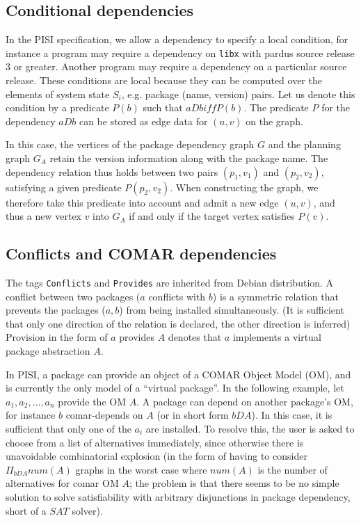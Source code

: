 \documentclass[a4paper,11pt]{article}
\begin{document}
\subsection{Conditional dependencies}

In the PISI specification, we allow a dependency to specify a local
condition, for instance a program may require a dependency on
\texttt{libx} with pardus source release $3$ or greater. Another
program may require a dependency on a particular source release. These
conditions are local because they can be computed over the elements of
system state $S_i$, e.g. package (name, version) pairs. Let us denote this
condition by a predicate $P(b)$ such that $aDb iff P(b)$.  The
predicate $P$ for the dependency $aDb$ can be stored as edge data for
$(u,v)$ on the graph.

In this case, the vertices of the package dependency graph $G$ and the
planning graph $G_A$ retain the version information along with the
package name. The dependency relation thus holds between two pairs
$(p_1,v_1)$ and $(p_2,v_2)$, satisfying a given predicate
$P(p_2,v_2)$. When constructing the graph, we therefore take this
predicate into account and admit a new edge $(u,v)$, and thus a new
vertex $v$ into $G_A$ if and only if the target vertex satisfies
$P(v)$.

\subsection{Conflicts and COMAR dependencies}

The tags \texttt{Conflicts} and \texttt{Provides} are inherited from
Debian distribution. A conflict between two packages ($a$ conflicts
with $b$) is a symmetric relation that prevents the packages ($a,b$)
from being installed simultaneously. (It is sufficient that only one
direction of the relation is declared, the other direction is
inferred) Provision in the form of $a$ provides $A$ denotes that $a$
implements a virtual package abstraction $A$.

In PISI, a package can provide an object of a COMAR Object Model (OM),
and is currently the only model of a ``virtual package''. In the
following example, let $a_1,a_2,\ldots,a_n$ provide the OM $A$. A package
can depend on another package's OM, for instance $b$ comar-depends on
$A$ (or in short form $bDA$). In this case, it is sufficient that only
one of the $a_i$ are installed. To resolve this, the user is asked to
choose from a list of alternatives immediately, since otherwise there
is unavoidable combinatorial explosion (in the form of having to
consider $\Pi_{bDA}num(A)$ graphs in the worst case where $num(A)$ is
the number of alternatives for comar OM $A$; the problem is that there
seems to be no simple solution to solve satisfiability with arbitrary
disjunctions in package dependency, short of a $SAT$ solver).
\end{document}
